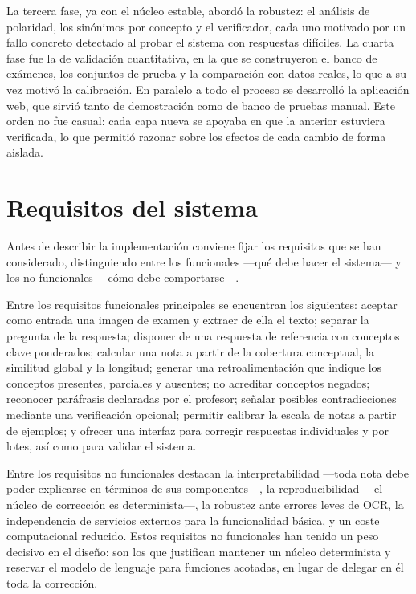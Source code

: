 La tercera fase, ya con el núcleo estable, abordó la robustez: el análisis de polaridad, los sinónimos por concepto y el verificador, cada uno motivado por un fallo concreto detectado al probar el sistema con respuestas difíciles. La cuarta fase fue la de validación cuantitativa, en la que se construyeron el banco de exámenes, los conjuntos de prueba y la comparación con datos reales, lo que a su vez motivó la calibración. En paralelo a todo el proceso se desarrolló la aplicación web, que sirvió tanto de demostración como de banco de pruebas manual. Este orden no fue casual: cada capa nueva se apoyaba en que la anterior estuviera verificada, lo que permitió razonar sobre los efectos de cada cambio de forma aislada.

\section{Requisitos del sistema}

Antes de describir la implementación conviene fijar los requisitos que se han considerado, distinguiendo entre los funcionales —qué debe hacer el sistema— y los no funcionales —cómo debe comportarse—.

Entre los requisitos funcionales principales se encuentran los siguientes: aceptar como entrada una imagen de examen y extraer de ella el texto; separar la pregunta de la respuesta; disponer de una respuesta de referencia con conceptos clave ponderados; calcular una nota a partir de la cobertura conceptual, la similitud global y la longitud; generar una retroalimentación que indique los conceptos presentes, parciales y ausentes; no acreditar conceptos negados; reconocer paráfrasis declaradas por el profesor; señalar posibles contradicciones mediante una verificación opcional; permitir calibrar la escala de notas a partir de ejemplos; y ofrecer una interfaz para corregir respuestas individuales y por lotes, así como para validar el sistema.

Entre los requisitos no funcionales destacan la interpretabilidad —toda nota debe poder explicarse en términos de sus componentes—, la reproducibilidad —el núcleo de corrección es determinista—, la robustez ante errores leves de OCR, la independencia de servicios externos para la funcionalidad básica, y un coste computacional reducido. Estos requisitos no funcionales han tenido un peso decisivo en el diseño: son los que justifican mantener un núcleo determinista y reservar el modelo de lenguaje para funciones acotadas, en lugar de delegar en él toda la corrección.

